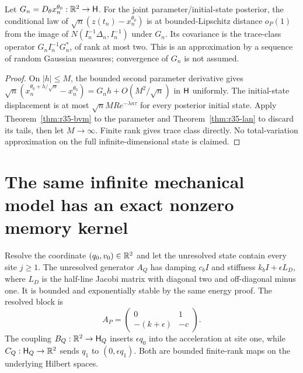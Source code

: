 \begin{corollary}\label{cor:r35-state}
Let $G_n=D_\theta x_n^{\theta_0}:\mathbb R^2\to\mathsf H$. For the joint parameter/initial-state posterior, the conditional law of
$\sqrt n(z(t_n)-x_n^{\theta_0})$ is at bounded-Lipschitz distance $o_P(1)$ from the image of $N(I_n^{-1}\Delta_n,I_n^{-1})$ under $G_n$. Its covariance is the trace-class operator $G_nI_n^{-1}G_n^*$, of rank at most two. This is an approximation by a sequence of random Gaussian measures; convergence of $G_n$ is not assumed.
\end{corollary}
\begin{proof}
On $|h|\le M$, the bounded second parameter derivative gives
$\sqrt n(x_n^{\theta_0+h/\sqrt n}-x_n^{\theta_0})=G_nh+O(M^2/\sqrt n)$ in $\mathsf H$ uniformly. The initial-state displacement is at most $\sqrt nMR e^{-\lambda n\tau}$ for every posterior initial state. Apply Theorem~\ref{thm:r35-bvm} to the parameter and Theorem~\ref{thm:r35-lan} to discard its tails, then let $M\to\infty$. Finite rank gives trace class directly. No total-variation approximation on the full infinite-dimensional state is claimed.
\end{proof}

\section{The same infinite mechanical model has an exact nonzero memory kernel}
\label{sec:r35-memory}
Resolve the coordinate $(q_0,v_0)\in\mathbb R^2$ and let the unresolved state contain every site $j\ge1$. The unresolved generator $A_Q$ has damping $c_bI$ and stiffness $k_bI+\epsilon L_D$, where $L_D$ is the half-line Jacobi matrix with diagonal two and off-diagonal minus one. It is bounded and exponentially stable by the same energy proof. The resolved block is
\[
 A_P=\begin{pmatrix}0&1\\-(k+\epsilon)&-c\end{pmatrix}.
\]
The coupling $B_Q:\mathbb R^2\to\mathsf H_Q$ inserts $\epsilon q_0$ into the acceleration at site one, while $C_Q:\mathsf H_Q\to\mathbb R^2$ sends $q_1$ to $(0,\epsilon q_1)$. Both are bounded finite-rank maps on the underlying Hilbert spaces.

